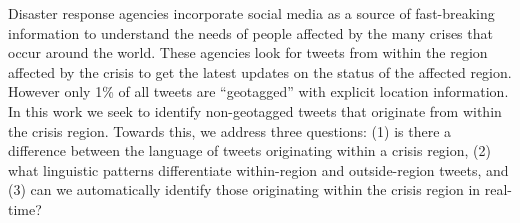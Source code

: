 Disaster response agencies incorporate social media as a source of fast-breaking information to understand the needs of people affected by the many crises that occur around the world. These agencies look for tweets from within the region affected by the crisis to get the latest updates on the status of the affected region. However only 1\% of all tweets are ``geotagged'' with explicit location information. In this work we seek to identify non-geotagged tweets that originate from within the crisis region. Towards this, we address three questions: (1) is there a difference between the language of tweets originating within a crisis region, (2)  what linguistic patterns differentiate within-region and outside-region tweets, and (3) can we automatically identify those originating within the crisis region in real-time?
